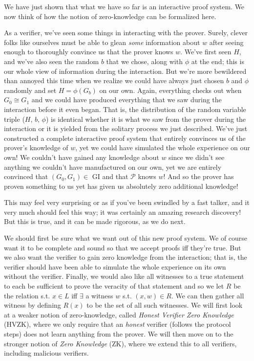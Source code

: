 \documentclass[12pt]{tufte-book}
\begin{document}
		We have just shown that what we have so far is an interactive proof system. We now think of how the notion of zero-knowledge can be formalized here.

		As a verifier, we've seen some things in interacting with the prover.  Surely, clever folks like ourselves must be able to glean \textit{some} information about $w$ after seeing enough to thoroughly convince us that the prover knows $w$.  We've first seen $H$, and we've also seen the random $b$ that we chose, along with $\phi$ at the end;  this is our whole view of information during the interaction.  But we're more bewildered than annoyed this time when we realize we could have always just chosen $b$ and $\phi$ randomly and set $H=\phi(G_b)$ on our own.  Again, everything checks out when $G_0 \cong G_1$ and we could have produced everything that we saw during the interaction before it even began.  That is, the distribution of the random variable triple ($H$, $b$, $\phi$) is identical whether it is what we saw from the prover during the interaction or it is yielded from the solitary process we just described.  We've just constructed a complete interactive proof system that entirely convinces us of the prover's knowledge of $w$, yet we could have simulated the whole experience on our own!  We couldn't have gained any knowledge about $w$ since we didn't see anything we couldn't have manufactured on our own, yet we are entirely convinced that $(G_0,G_1)\in$ GI and that $\mathcal{P}$ knows $w$!  And so the prover has proven something to us yet has given us absolutely zero additional knowledge!

		This may feel very surprising or as if you've been swindled by a fast talker, and it very much should feel this way; it was certainly an amazing research discovery!  But this is true, and it can be made rigorous, as we do next.

		We should first be sure what we want out of this new proof system.  We of course want it to be complete and sound so that we accept proofs iff they're true.  But we also want the verifier to gain zero knowledge from the interaction; that is, the verifier should have been able to simulate the whole experience on its own without the verifier.
		Finally, we would also like all witnesses to a true statement to each be sufficient to prove the veracity of that statement and so we let $R$ be the relation s.t. $x \in L$ iff $\exists$ a witness $w$ s.t. $(x,w)\in R$.  We can then gather all witness by defining $R(x)$ to be the set of all such witnesses. We will first look at a weaker notion of zero-knowledge, called \textit{Honest Verifier Zero Knowledge} (HVZK), where we only require that an {\em honest} verifier (follows the protocol steps) does not learn anything from the prover. We will then move on to the stronger notion of \textit{Zero Knowledge} (ZK), where we extend this to all verifiers, including malicious verifiers.
\end{document}
